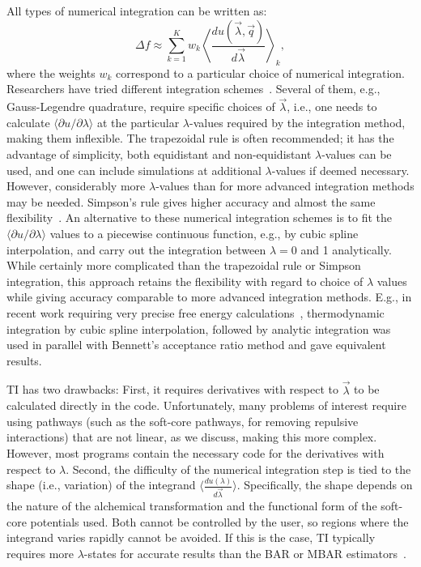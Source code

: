\documentclass[9pt,bestpractices]{livecoms}
\newcommand{\expect}[1]{\left\langle{#1}\right\rangle}
\begin{document}
All types of numerical integration can be written as:
\[ \Delta f \approx \sum_{k=1}^{K} w_k
\expect{\frac{du(\vec{\lambda},\vec{q})}{d\vec{\lambda}}}_{k}, \] where the weights $w_k$ correspond to a particular choice of numerical integration.
Researchers have tried different integration schemes~\cite{resat1993studies,jorge2010effect,shyu2009reducing,Bruckner2010}. Several of them, e.g., Gauss-Legendre quadrature, require specific choices of $\vec{\lambda}$, i.e., one needs to calculate $\langle\partial u/\partial \lambda\rangle$ at the particular $\lambda$-values required by the integration method, making them inflexible. The trapezoidal rule is often recommended; it has the advantage of simplicity, both equidistant and non-equidistant $\lambda$-values can be used, and one can include simulations at additional $\lambda$-values if deemed necessary. However, considerably more $\lambda$-values than for more advanced integration methods may be needed. Simpson's rule gives higher accuracy and almost the same flexibility~\cite{Bruckner2010}. An alternative to these numerical integration schemes is to fit the  $\langle\partial u/\partial \lambda\rangle$ values to a piecewise continuous function, e.g., by cubic spline interpolation, and carry out the integration between $\lambda=0$ and 1 analytically. While certainly more complicated than the trapezoidal rule or Simpson integration,  this approach retains the flexibility with regard to choice of $\lambda$ values while giving accuracy comparable to more advanced integration methods. E.g., in recent work requiring very precise free energy calculations~\cite{Fleck_2021}, thermodynamic integration by cubic spline interpolation, followed by analytic integration  was used in parallel with Bennett's acceptance ratio method and gave equivalent results.

TI has two drawbacks: First, it requires derivatives with respect to $\vec{\lambda}$ to be calculated directly in the code. Unfortunately, many problems of interest require using pathways (such as the soft-core pathways, for removing repulsive interactions) that are not linear, as we discuss, making this more complex. However, most programs contain the necessary code for the derivatives with respect to $\lambda$. Second, the difficulty of the numerical integration step is tied to the shape (i.e., variation) of the integrand $\langle\frac{du(\lambda)}{d\vec{\lambda}}\rangle$. Specifically, the shape depends on the nature of the alchemical transformation and the functional form of the soft-core potentials used. Both cannot be controlled by the user, so regions where the integrand varies rapidly cannot be avoided. If this is the case, TI typically requires more $\lambda$-states for accurate results than the BAR or MBAR estimators~\cite{Bruckner2010}.
\end{document}
